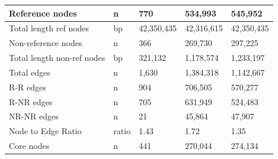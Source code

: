 \documentclass[../main.tex]{subfiles}
\begin{document}
\begin{table}[!htb]
\begin{center}
\begin{tabular}{|l|l|l|l|l|}
   Reference nodes                           & n                                  & 770                                              & 534,993                                     & 545,952                                        \\ 
   \hline
   Total length ref nodes                    & bp                                 & 42,350,435                                       & 42,316,615                                  & 42,350,435                                     \\ 
   \hline
   Non-reference nodes                       & n                                  & 366                                              & 269,730                                     & 297,225                                        \\ 
   \hline
   Total length non-ref nodes                & bp                                 & 321,132                                          & 1,178,574                                   & 1,233,197                                      \\ 
   \hline
   Total edges                               & n                                  & 1,630                                            & 1,384,318                                   & 1,142,667                                      \\ 
   \hline
   R-R edges                                 & n                                  & 904                                              & 706,505                                     & 570,277                                        \\ 
   \hline
   R-NR edges                                & n                                  & 705                                              & 631,949                                     & 524,483                                        \\ 
   \hline
   NR-NR edges                               & n                                  & 21                                               & 45,864                                      & 47,907                                         \\ 
   \hline
   Node to Edge Ratio                        & ratio                              & 1.43                                             & 1.72                                        & 1.35                                           \\ 
   \hline
   Core nodes                                & n                                  & 441                                              & 270,044                                     & 274,134                                        \\ 

\end{tabular}
\end{center}
\end{table}
\end{document}
